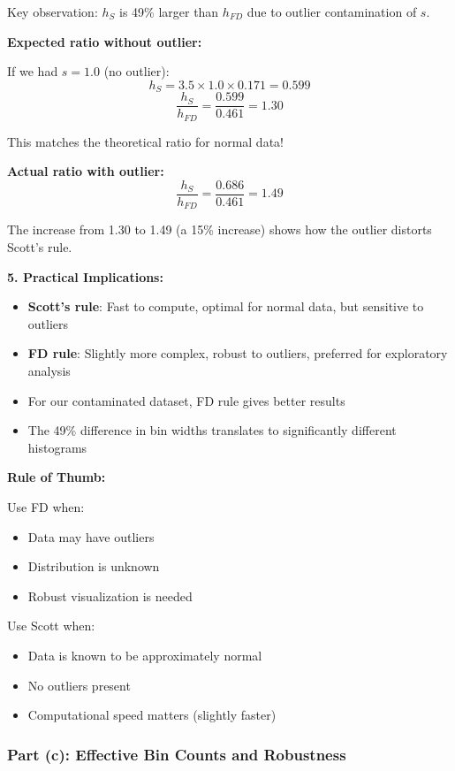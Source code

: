 \documentclass[12pt]{article}
\begin{document}
\begin{explanation}
Key observation: \(h_S\) is 49\% larger than \(h_{FD}\) due to outlier contamination of \(s\).

\textbf{Expected ratio without outlier:}

If we had \(s = 1.0\) (no outlier):
\[
h_S = 3.5 \times 1.0 \times 0.171 = 0.599
\]
\[
\frac{h_S}{h_{FD}} = \frac{0.599}{0.461} = 1.30
\]

This matches the theoretical ratio for normal data!

\textbf{Actual ratio with outlier:}
\[
\frac{h_S}{h_{FD}} = \frac{0.686}{0.461} = 1.49
\]

The increase from 1.30 to 1.49 (a 15\% increase) shows how the outlier distorts Scott's rule.

\textbf{5. Practical Implications:}

\begin{itemize}
    \item \textbf{Scott's rule}: Fast to compute, optimal for normal data, but sensitive to outliers
    \item \textbf{FD rule}: Slightly more complex, robust to outliers, preferred for exploratory analysis
    \item For our contaminated dataset, FD rule gives better results
    \item The 49\% difference in bin widths translates to significantly different histograms
\end{itemize}

\textbf{Rule of Thumb:}

Use FD when:
\begin{itemize}
    \item Data may have outliers
    \item Distribution is unknown
    \item Robust visualization is needed
\end{itemize}

Use Scott when:
\begin{itemize}
    \item Data is known to be approximately normal
    \item No outliers present
    \item Computational speed matters (slightly faster)
\end{itemize}
\end{explanation}

\subsubsection{Part (c): Effective Bin Counts and Robustness}
\end{document}
